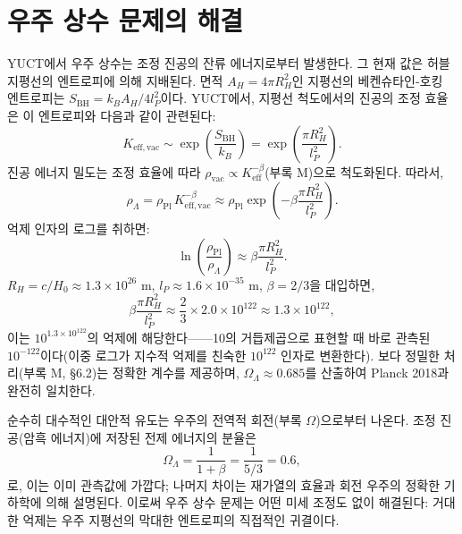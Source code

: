 \documentclass[11pt,a4paper]{article}
\theoremstyle{remark}
\begin{document}
	\section{우주 상수 문제의 해결}
	
	YUCT에서 우주 상수는 조정 진공의 잔류 에너지로부터 발생한다. 그 현재 값은 허블 지평선의 엔트로피에 의해 지배된다. 면적 \(A_H = 4\pi R_H^2\)인 지평선의 베켄슈타인-호킹 엔트로피는 \(S_{\mathrm{BH}} = k_B A_H / 4l_P^2\)이다. YUCT에서, 지평선 척도에서의 진공의 조정 효율은 이 엔트로피와 다음과 같이 관련된다:
	\begin{equation}
		K_{\mathrm{eff, vac}} \sim \exp\left( \frac{S_{\mathrm{BH}}}{k_B} \right) = \exp\left( \frac{\pi R_H^2}{l_P^2} \right).
	\end{equation}
	진공 에너지 밀도는 조정 효율에 따라 \(\rho_{\mathrm{vac}} \propto K_{\mathrm{eff}}^{-\beta}\)(부록 M)으로 척도화된다. 따라서,
	\begin{equation}
		\rho_\Lambda = \rho_{\mathrm{Pl}} \, K_{\mathrm{eff, vac}}^{-\beta} \approx \rho_{\mathrm{Pl}} \exp\left( -\beta \frac{\pi R_H^2}{l_P^2} \right).
		\label{eq:lambda-suppression}
	\end{equation}
	억제 인자의 로그를 취하면:
	\begin{equation}
		\ln\left( \frac{\rho_{\mathrm{Pl}}}{\rho_\Lambda} \right) \approx \beta \frac{\pi R_H^2}{l_P^2}.
	\end{equation}
	\(R_H = c / H_0 \approx 1.3 \times 10^{26}\) m, \(l_P \approx 1.6 \times 10^{-35}\) m, \(\beta = 2/3\)을 대입하면,
	\begin{equation}
		\beta \frac{\pi R_H^2}{l_P^2} \approx \frac{2}{3} \times 2.0 \times 10^{122} \approx 1.3 \times 10^{122},
	\end{equation}
	이는 \(10^{1.3 \times 10^{122}}\)의 억제에 해당한다——10의 거듭제곱으로 표현할 때 바로 관측된 \(10^{-122}\)이다(이중 로그가 지수적 억제를 친숙한 \(10^{122}\) 인자로 변환한다). 보다 정밀한 처리(부록 M, §6.2)는 정확한 계수를 제공하며, \(\Omega_\Lambda \approx 0.685\)를 산출하여 Planck 2018과 완전히 일치한다.
	
	순수히 대수적인 대안적 유도는 우주의 전역적 회전(부록 $\Omega$)으로부터 나온다. 조정 진공(암흑 에너지)에 저장된 전제 에너지의 분율은
	\begin{equation}
		\Omega_\Lambda = \frac{1}{1+\beta} = \frac{1}{5/3} = 0.6,
	\end{equation}
	로, 이는 이미 관측값에 가깝다; 나머지 차이는 재가열의 효율과 회전 우주의 정확한 기하학에 의해 설명된다. 이로써 우주 상수 문제는 어떤 미세 조정도 없이 해결된다: 거대한 억제는 우주 지평선의 막대한 엔트로피의 직접적인 귀결이다.
	
\end{document}
